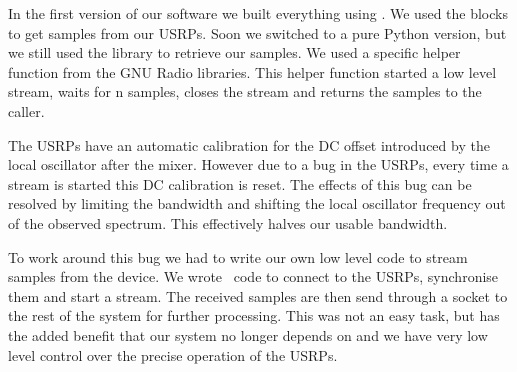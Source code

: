 \documentclass[a4paper, openany, oneside]{memoir}
\begin{document}
In the first version of our software we built everything using . We used the  blocks to get samples from our USRPs. Soon we switched to a pure Python version, but we still used the  library to retrieve our samples. We used a specific helper function  from the GNU Radio libraries. This helper function started a low level stream, waits for n samples, closes the stream and returns the samples to the caller.

The USRPs have an automatic calibration for the DC offset introduced by the local oscillator after the mixer. However due to a bug in the USRPs, every time a stream is started this DC calibration is reset. The effects of this bug can be resolved by limiting the bandwidth and shifting the local oscillator frequency out of the observed spectrum. This effectively halves our usable bandwidth.

To work around this bug we had to write our own low level code to stream samples from the device. We wrote \CC~code to connect to the USRPs, synchronise them and start a stream. The received samples are then send through a socket to the rest of the system for further processing. This was not an easy task, but has the added benefit that our system no longer depends on  and we have very low level control over the precise operation of the USRPs.
\end{document}
